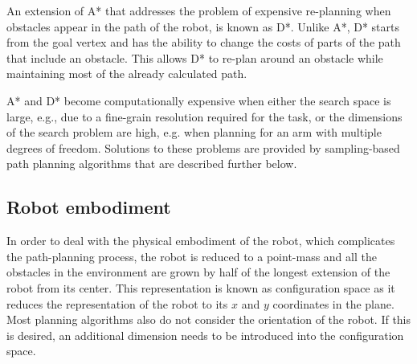 An extension of A* that addresses the problem of expensive re-planning when obstacles appear in the path of the robot, is known as D*. Unlike A*, D* starts from the goal vertex and has the ability to change the costs of parts of the path that include an obstacle. This allows D* to re-plan around an obstacle while maintaining most of the already calculated path.

A* and D* become computationally expensive when either the search space is large, e.g., due to a fine-grain resolution required for the task, or the dimensions of the search problem are high, e.g. when planning for an arm with multiple degrees of freedom. Solutions to these problems are provided by sampling-based path planning algorithms that are described further below.



\subsection{Robot embodiment}
In order to deal with the physical embodiment of the robot, which complicates the path-planning process, the robot is reduced to a point-mass and all the obstacles in the environment are grown by half of the longest extension of the robot from its center. This representation is known as configuration space as it reduces the representation of the robot to its $x$ and $y$ coordinates in the plane. Most planning algorithms also do not consider the orientation of the robot. If this is desired, an additional dimension needs to be introduced into the  configuration space.

